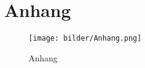 \chapter*{Anhang}
\setcounter{chapter}{3}
\setcounter{section}{0}
\setcounter{subsection}{0}

\begin{figure}[ht]
    \centering
    \texttt{[image: bilder/Anhang.png]}
    \caption{Anhang}
    \label{fig:Anhang}
\end{figure}